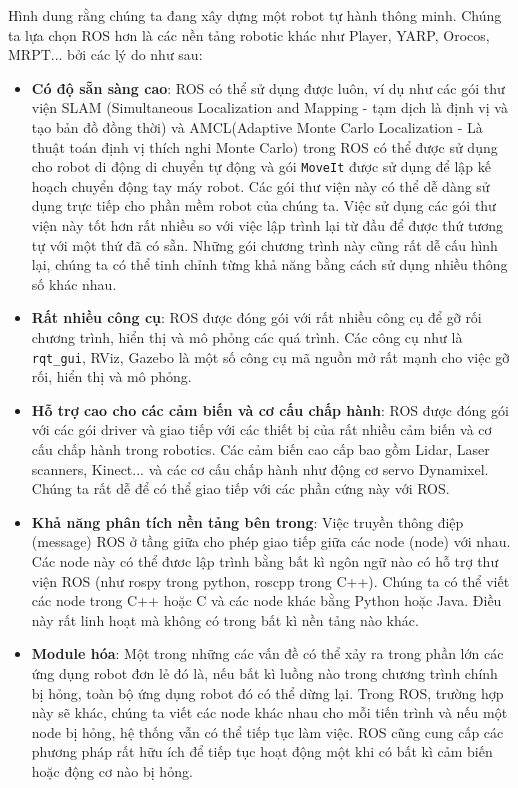{Hình dung rằng chúng ta đang xây dựng một robot tự hành thông minh. Chúng ta lựa chọn ROS hơn là các nền tảng robotic khác như Player, YARP, Orocos, MRPT... bởi các lý do như sau:
\begin{itemize}
	\item \textbf{Có độ sẵn sàng cao}: ROS có thể sử dụng được luôn, ví dụ như các gói thư viện SLAM (Simultaneous Localization and Mapping - tạm dịch là định vị và tạo bản đồ đồng thời) và AMCL(Adaptive Monte Carlo Localization - Là thuật toán định vị thích nghi Monte Carlo) trong ROS có thể được sử dụng cho robot di động di chuyển tự động và gói {\tt MoveIt} được sử dụng để lập kế hoạch chuyển động tay máy robot. Các gói thư viện này có thể dễ dàng sử dụng trực tiếp cho phần mềm robot của chúng ta. Việc sử dụng các gói thư viện này tốt hơn rất nhiều so với việc lập trình lại từ đầu để được thứ tương tự với một thứ đã có sẵn. Những gói chương trình này cũng rất dễ cấu hình lại, chúng ta có thể tinh chỉnh từng khả năng bằng cách sử dụng nhiều thông số khác nhau.
	\item \textbf{Rất nhiều công cụ}: ROS được đóng gói với rất nhiều công cụ để gỡ rối chương trình, hiển thị và mô phỏng các quá trình. Các công cụ như là {\tt rqt\_gui}, RViz, Gazebo là một số công cụ mã nguồn mở rất mạnh cho việc gỡ rối, hiển thị và mô phỏng.
	\item \textbf{Hỗ trợ cao cho các cảm biến và cơ cấu chấp hành}: ROS được đóng gói với các gói driver và giao tiếp với các thiết bị của rất nhiều cảm biến và cơ cấu chấp hành trong robotics. Các cảm biến cao cấp bao gồm Lidar, Laser scanners, Kinect... và các cơ cấu chấp hành như động cơ servo Dynamixel. Chúng ta rất dễ để có thể giao tiếp với các phần cứng này với ROS.
	\item \textbf{Khả năng phân tích nền tảng bên trong}: Việc truyền thông điệp (message) ROS ở tầng giữa cho phép giao tiếp giữa các node (node) với nhau. Các node này có thể đươc lập trình bằng bất kì ngôn ngữ nào có hỗ trợ thư viện ROS (như rospy trong python, roscpp trong C++). Chúng ta có thể viết các node trong C++ hoặc C và các node khác bằng Python hoặc Java. Điều này rất linh hoạt mà không có trong bất kì nền tảng nào khác.
	\item \textbf{Module hóa}: Một trong những các vấn đề có thể xảy ra trong phần lớn các ứng dụng robot đơn lẻ đó là, nếu bất kì luồng nào trong chương trình chính bị hỏng, toàn bộ ứng dụng robot đó có thể dừng lại. Trong ROS, trường hợp này sẽ khác, chúng ta viết các node khác nhau cho mỗi tiến trình và nếu một node bị hỏng, hệ thống vẫn có thể tiếp tục làm việc. ROS cũng cung cấp các phương pháp rất hữu ích để tiếp tục hoạt động một khi có bất kì cảm biến hoặc động cơ nào bị hỏng.

\end{itemize}}
